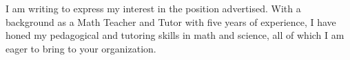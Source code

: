 
I am writing to express my interest in the \position\; position advertised. With a background as a Math Teacher and Tutor with five years of experience, I have honed my pedagogical and tutoring skills in math and science, all of which I am eager to bring to your organization.
